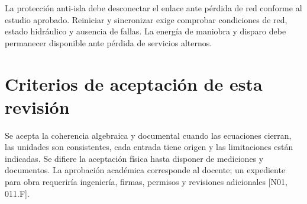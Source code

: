 La protección anti-isla debe desconectar el enlace ante pérdida de red conforme al estudio aprobado. Reiniciar y sincronizar exige comprobar condiciones de red, estado hidráulico y ausencia de fallas. La energía de maniobra y disparo debe permanecer disponible ante pérdida de servicios alternos.

\section{Criterios de aceptación de esta revisión}
Se acepta la coherencia algebraica y documental cuando las ecuaciones cierran, las unidades son consistentes, cada entrada tiene origen y las limitaciones están indicadas. Se difiere la aceptación física hasta disponer de mediciones y documentos. La aprobación académica corresponde al docente; un expediente para obra requeriría ingeniería, firmas, permisos y revisiones adicionales [N01, 011.F].
